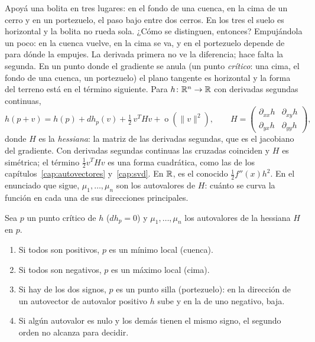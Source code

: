 Apoyá una bolita en tres lugares: en el fondo de una cuenca, en la cima de un cerro y en un
portezuelo, el paso bajo entre dos cerros. En los tres el suelo es horizontal y la bolita no
rueda sola. ¿Cómo se distinguen, entonces? Empujándola un poco: en la cuenca vuelve, en la
cima se va, y en el portezuelo depende de para dónde la empujes. La derivada primera no ve la
diferencia; hace falta la segunda. En un punto donde el gradiente se anula (un punto
\emph{crítico}: una cima, el fondo de una cuenca, un portezuelo) el plano tangente es
horizontal y la forma del terreno está en el término siguiente. Para
\(h\colon\mathbb{R}^n\to\mathbb{R}\) con derivadas segundas continuas,
\[
  h(p+v)=h(p)+dh_p(v)+\tfrac12\,v^THv+\operatorname{o}(\lVert v\rVert^2),
  \qquad
  H=\begin{pmatrix}\partial_{xx}h&\partial_{xy}h\\ \partial_{yx}h&\partial_{yy}h\end{pmatrix},
\]
donde \(H\) es la \emph{hessiana}: la matriz de las derivadas segundas, que es el jacobiano del
gradiente. Con derivadas segundas continuas las cruzadas coinciden y \(H\) es simétrica; el
término \(\tfrac12v^THv\) es una forma cuadrática, como las de los capítulos~\ref{cap:autovectores}
y~\ref{cap:svd}. En \(\mathbb{R}\), es el conocido \(\tfrac12f''(x)h^2\). En el enunciado que sigue,
\(\mu_1,\ldots,\mu_n\) son los autovalores de \(H\): cuánto se curva la función en cada
una de sus direcciones principales.

\begin{proposicion}\label{prop:hessiana-criterio}
Sea \(p\) un punto crítico de \(h\) (\(dh_p=0\)) y \(\mu_1,\ldots,\mu_n\) los
autovalores de la hessiana \(H\) en \(p\).
\begin{enumerate}[label=(\alph*)]
  \item Si todos son positivos, \(p\) es un mínimo local (cuenca).
  \item Si todos son negativos, \(p\) es un máximo local (cima).
  \item Si hay de los dos signos, \(p\) es un punto silla (portezuelo): en la dirección de un
  autovector de autovalor positivo \(h\) sube y en la de uno negativo, baja.
  \item Si algún autovalor es nulo y los demás tienen el mismo signo, el segundo orden no
  alcanza para decidir.
\end{enumerate}
\end{proposicion}

